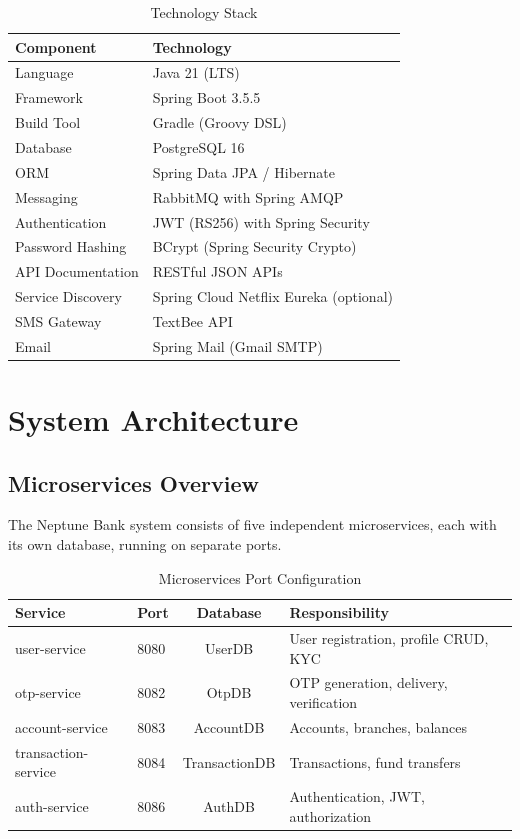 \documentclass[12pt,a4paper]{report}
\begin{document}
\begin{table}[H]
\centering
\caption{Technology Stack}
\begin{tabularx}{\textwidth}{lX}
\toprule
\textbf{Component} & \textbf{Technology} \\
\midrule
Language & Java 21 (LTS) \\
Framework & Spring Boot 3.5.5 \\
Build Tool & Gradle (Groovy DSL) \\
Database & PostgreSQL 16 \\
ORM & Spring Data JPA / Hibernate \\
Messaging & RabbitMQ with Spring AMQP \\
Authentication & JWT (RS256) with Spring Security \\
Password Hashing & BCrypt (Spring Security Crypto) \\
API Documentation & RESTful JSON APIs \\
Service Discovery & Spring Cloud Netflix Eureka (optional) \\
SMS Gateway & TextBee API \\
Email & Spring Mail (Gmail SMTP) \\
\bottomrule
\end{tabularx}
\end{table}

\chapter{System Architecture}

\section{Microservices Overview}
The Neptune Bank system consists of five independent microservices, each with its own database, running on separate ports.

\begin{table}[H]
\centering
\caption{Microservices Port Configuration}
\begin{tabularx}{\textwidth}{llcX}
\toprule
\textbf{Service} & \textbf{Port} & \textbf{Database} & \textbf{Responsibility} \\
\midrule
user-service & 8080 & UserDB & User registration, profile CRUD, KYC \\
otp-service & 8082 & OtpDB & OTP generation, delivery, verification \\
account-service & 8083 & AccountDB & Accounts, branches, balances \\
transaction-service & 8084 & TransactionDB & Transactions, fund transfers \\
auth-service & 8086 & AuthDB & Authentication, JWT, authorization \\
\bottomrule
\end{tabularx}
\end{table}
\end{document}
